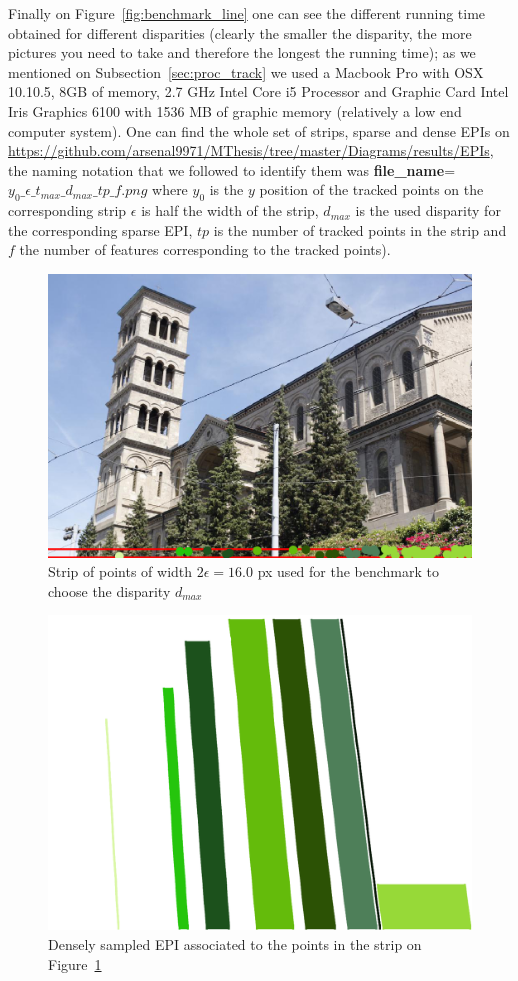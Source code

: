 \begin{itemize}
Finally on Figure~\ref{fig:benchmark_line} one can see the different running time obtained for different disparities (clearly the smaller the disparity, the more pictures you need to take and therefore the longest the running time); as we mentioned on Subsection~\ref{sec:proc_track} we used a Macbook Pro with OSX 10.10.5, 8GB of memory, 2.7 GHz Intel Core i5 Processor and Graphic Card Intel Iris Graphics 6100 with 1536 MB of graphic memory (relatively a low end computer system). One can find the whole set of strips, sparse and dense EPIs on \url{https://github.com/arsenal9971/MThesis/tree/master/Diagrams/results/EPIs}, the naming notation that we followed to identify them was \textbf{file\_name}=$y_0\_\epsilon\_t_{max}\_d_{max}\_tp\_f.png$ where $y_0$ is the $y$ position of the tracked points on the corresponding strip $\epsilon$ is half the width of the strip, $d_{max}$ is the used disparity for the corresponding sparse EPI, $tp$ is the number of tracked points in the strip and $f$ the number of features corresponding to the tracked points).

\bigskip

\begin{figure}[h!]
\centering
\includegraphics[width = 0.7 \textwidth]{./Diagrams/results/Disparity_benchmark/673_10_102_4_48_8_strip.png}
\caption{Strip of points of width $2\epsilon = 16.0$ px used for the benchmark to choose the disparity $d_{max}$}
\label{fig:strip_disparity}
\end{figure}

\begin{figure}[h!]
\centering
\includegraphics[width = 0.7 \textwidth]{./Diagrams/results/Disparity_benchmark/673_10_102_4_48_8_dense.png}
\caption{Densely sampled EPI associated to the points in the strip on Figure~\ref{fig:strip_disparity}}
\label{fig:dense_disparity}
\end{figure}


\end{itemize}
